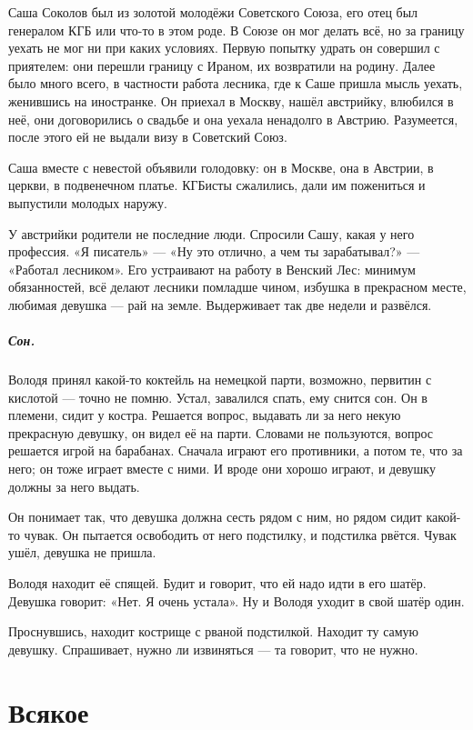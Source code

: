 \documentclass{book}
\begin{document}
Саша Соколов был из золотой молодёжи Советского Союза, его отец был генералом КГБ или что-то в этом роде.
В Союзе он мог делать всё, но за границу уехать не мог ни при каких условиях.
Первую попытку удрать он совершил с приятелем: они перешли границу с Ираном, их возвратили на родину.
Далее было много всего, в частности работа лесника, где к Саше пришла мысль уехать, женившись на иностранке.
Он приехал в Москву, нашёл австрийку, влюбился в неё, они договорились о свадьбе и она уехала ненадолго в Австрию.
Разумеется, после этого ей не выдали визу в Советский Союз.

Саша вместе с невестой объявили голодовку: он в Москве, она в Австрии, в церкви, в подвенечном платье.
КГБисты сжалились, дали им пожениться и выпустили молодых наружу.

У австрийки родители не последние люди.
Спросили Сашу, какая у него профессия.
«Я писатель» --- «Ну это отлично, а чем ты зарабатывал?» --- «Работал лесником».
Его устраивают на работу в Венский Лес: 
минимум обязанностей, 
всё делают лесники помладше чином, 
избушка в прекрасном месте, 
любимая девушка ---
рай на земле.
Выдерживает так две недели и развёлся.

\paragraph{Сон.}
Володя принял какой-то коктейль на немецкой парти, возможно, первитин с кислотой --- точно не помню.
Устал, завалился спать, ему снится сон.
Он в племени, сидит у костра. 
Решается вопрос, выдавать ли за него некую прекрасную девушку, он видел её на парти.
Словами не пользуются, вопрос решается игрой на барабанах. 
Сначала играют его противники, а потом те, что за него;
он тоже играет вместе с ними.
И вроде они хорошо играют, и девушку должны за него выдать.

Он понимает так, что девушка должна сесть рядом с ним, но рядом сидит какой-то чувак.
Он пытается освободить от него подстилку, и подстилка рвётся.
Чувак ушёл, девушка не пришла.

Володя находит её спящей.
Будит и говорит, что ей надо идти в его шатёр.
Девушка говорит: «Нет. Я очень устала».
Ну и Володя уходит в свой шатёр один.

Проснувшись, находит кострище с рваной подстилкой.
Находит ту самую девушку.
Спрашивает, нужно ли извиняться --- та говорит, что не нужно.




\chapter*{Всякое}
\end{document}
